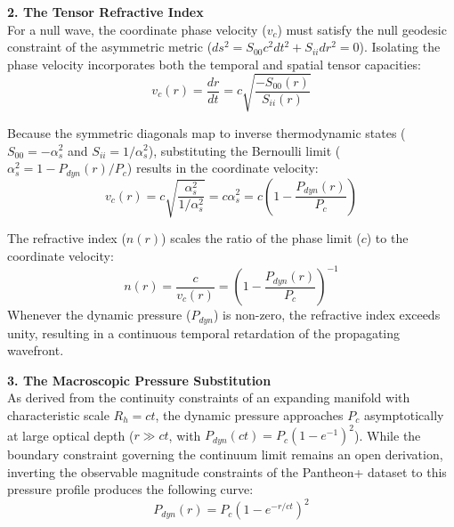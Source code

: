 \vspace{0.2 cm}

\textbf{2. The Tensor Refractive Index} \\ 
For a null wave, the coordinate phase velocity ($v_c$) must satisfy the null geodesic constraint of the asymmetric metric ($ds^2 = S_{00} c^2 dt^2 + S_{ii} dr^2 = 0$). Isolating the phase velocity incorporates both the temporal and spatial tensor capacities: 
\begin{equation}
    v_c(r) = \frac{dr}{dt} = c \sqrt{\frac{-S_{00}(r)}{S_{ii}(r)}}
\end{equation}

Because the symmetric diagonals map to inverse thermodynamic states ($S_{00} = -\alpha_s^2$ and $S_{ii} = 1/\alpha_s^2$), substituting the Bernoulli limit ($\alpha_s^2 = 1 - P_{dyn}(r)/P_c$) results in the coordinate velocity: 
\begin{equation}
    v_c(r) = c \sqrt{\frac{\alpha_s^2}{1/\alpha_s^2}} = c \alpha_s^2 = c \left( 1 - \frac{P_{dyn}(r)}{P_c} \right)
\end{equation}

The refractive index ($n(r)$) scales the ratio of the phase limit ($c$) to the coordinate velocity: 
\begin{equation}
    n(r) = \frac{c}{v_c(r)} = \left( 1 - \frac{P_{dyn}(r)}{P_c} \right)^{-1}
\end{equation}
Whenever the dynamic pressure ($P_{dyn}$) is non-zero, the refractive index exceeds unity, resulting in a continuous temporal retardation of the propagating wavefront.

\vspace{0.2 cm}

\textbf{3. The Macroscopic Pressure Substitution} \\ 
As derived from the continuity constraints of an expanding manifold with characteristic scale $R_h = ct$, the dynamic pressure approaches $P_c$ asymptotically at large optical depth ($r \gg ct$, with $P_{dyn}(ct) = P_c(1 - e^{-1})^2$). While the boundary constraint governing the continuum limit remains an open derivation, inverting the observable magnitude constraints of the Pantheon+ dataset \cite{Brout2022} to this pressure profile produces the following curve: %
\begin{equation}
    P_{dyn}(r) = P_c \left( 1 - e^{-r/ct} \right)^2 \label{eq:dark_energy}
\end{equation}

